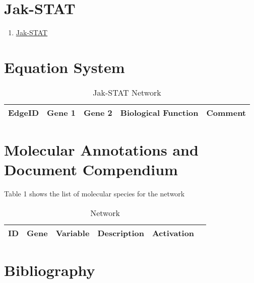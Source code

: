
\section{Jak-STAT}

\begin{enumerate}
\item \href{https://www.genome.jp/kegg-bin/show_pathway?map=hsa04630&show_description=show}{Jak-STAT}
\end{enumerate}

\section{Equation System}


\begin{table}[H]
	\tiny
	\begin{tabular}{p{1cm}p{1cm}p{3cm}p{1cm}p{1cm}} 
		EdgeID & Gene 1 & Gene 2 & Biological Function & Comment \\
		\hline
    
    \end{tabular}
	\caption{Jak-STAT Network}
	\label{tab:Table2}
\end{table}


\section{Molecular Annotations and Document Compendium}

Table 1 shows the list of molecular species for the network
\vspace{8pt}
\begin{table}[H]
	\begin{tabular}{rlllll}
		\hline
		ID & Gene & Variable & Description & Activation \\ 
		\hline

		\hline
	\end{tabular}
	\caption{Network}
	\label{tab:Table2}
\end{table}

\section{Bibliography}

